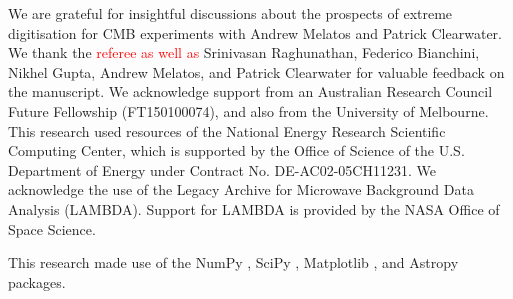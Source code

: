 \documentclass[apj]{emulateapj}
\newcommand{\changed}[1]{\textcolor{Red}{#1}}
\begin{document}
We are grateful for insightful discussions about the prospects of extreme digitisation for CMB experiments with Andrew Melatos and Patrick Clearwater.
We thank the \changed{referee as well as} Srinivasan Raghunathan, Federico Bianchini, Nikhel Gupta, Andrew Melatos, and Patrick Clearwater for valuable feedback on the manuscript.
We acknowledge support from an Australian Research Council Future Fellowship (FT150100074), and also from the University of Melbourne. 
This research used resources of the National Energy Research Scientific Computing Center, which is supported by the Office of Science of the U.S. Department of Energy under Contract No. DE-AC02-05CH11231. 
We acknowledge the use of the Legacy Archive for Microwave Background Data Analysis (LAMBDA). Support for LAMBDA is provided by the NASA Office of Space Science.


This research made use of the NumPy \citep{numpy}, SciPy \citep{scipy}, Matplotlib \citep{matplotlib}, and Astropy \citep{astropy} packages.

\newpage

\appendix
\end{document}

